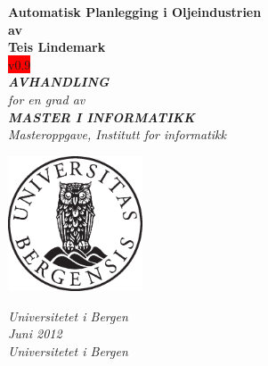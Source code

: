\documentclass[12pt,twoside,norsk,onecolumn]{article}
\begin{document}
\newcommand{\versjon}{v0.9}

\thispagestyle{empty}
\begin{center}        %
  \vspace{5mm}          %
  \LARGE
  \textbf{Automatisk Planlegging i Oljeindustrien} \\
  \Large
  \vspace{5mm}
  \textbf{av} \\
  \vspace{5mm}
  \large
  \textbf{Teis Lindemark} \\
  \colorbox{red}{\versjon} \\
  \vspace{30mm}
  \Large
  {\bf{\textsl{AVHANDLING}}} \\
  \textsl{for en grad av} \\
  \vspace{2mm}
  {\bf{\textsl{MASTER I INFORMATIKK}}} \\
  \vspace{5mm}
  {\large \textsl {Masteroppgave, Institutt for informatikk}}\\
  \vspace{10mm}
  \centerline{\includegraphics[width=4cm,height=4cm]{uibugle}}
  \vspace{5mm}
  \textsl{Universitetet i Bergen} \\
  \vspace{10mm}
  \large
  \textsl{Juni 2012} \\
  \vspace{5mm}
  \normalsize
  \textsl{Universitetet i Bergen} \\
\end{center}
\newpage
\end{document}
